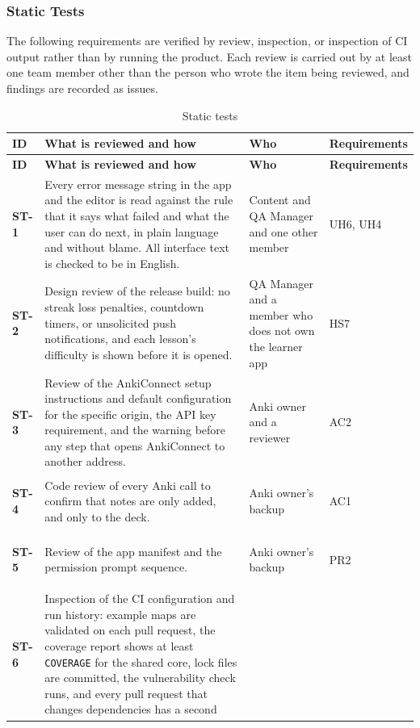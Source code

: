 \documentclass[12pt, titlepage]{article}
\newcommand{\tid}[1]{\hypertarget{test:#1}{\textbf{#1}}}
\newcommand{\cn}[1]{\texttt{#1}}
\begin{document}
\subsubsection{Static Tests} \label{SecStaticTests}

The following requirements are verified by review, inspection, or inspection of CI
output rather than by running the product. Each review is carried out by at least
one team member other than the person who wrote the item being reviewed, and
findings are recorded as issues.

\begin{longtable}{@{}P{0.08\textwidth}P{0.34\textwidth}P{0.2\textwidth}P{0.3\textwidth}@{}}
\caption{Static tests} \label{TblStatic}\\
\toprule
\textbf{ID} & \textbf{What is reviewed and how} & \textbf{Who} &
\textbf{Requirements}\\
\midrule
\endfirsthead
\toprule
\textbf{ID} & \textbf{What is reviewed and how} & \textbf{Who} &
\textbf{Requirements}\\
\midrule
\endhead
\tid{ST-1} & Every error message string in the app and the editor is read against
the rule that it says what failed and what the user can do next, in plain
language and without blame. All interface text is checked to be in English. &
Content and QA Manager and one other member & UH6, UH4\\
\tid{ST-2} & Design review of the release build: no streak loss penalties,
countdown timers, or unsolicited push notifications, and each lesson's
difficulty is shown before it is opened. & QA Manager and a member who does not
own the learner app & HS7\\
\tid{ST-3} & Review of the AnkiConnect setup instructions and default
configuration for the specific origin, the API key requirement, and the warning
before any step that opens AnkiConnect to another address. & Anki owner and a
reviewer & AC2\\
\tid{ST-4} & Code review of every Anki call to confirm that notes are only
added, and only to the \progname{} deck. & Anki owner's backup & AC1\\
\tid{ST-5} & Review of the app manifest and the permission prompt sequence. &
Anki owner's backup & PR2\\
\tid{ST-6} & Inspection of the CI configuration and run history: example maps
are validated on each pull request, the coverage report shows at least
\cn{COVERAGE} for the shared core, lock files are committed, the vulnerability
check runs, and every pull request that changes dependencies has a second

\end{longtable}
\end{document}
